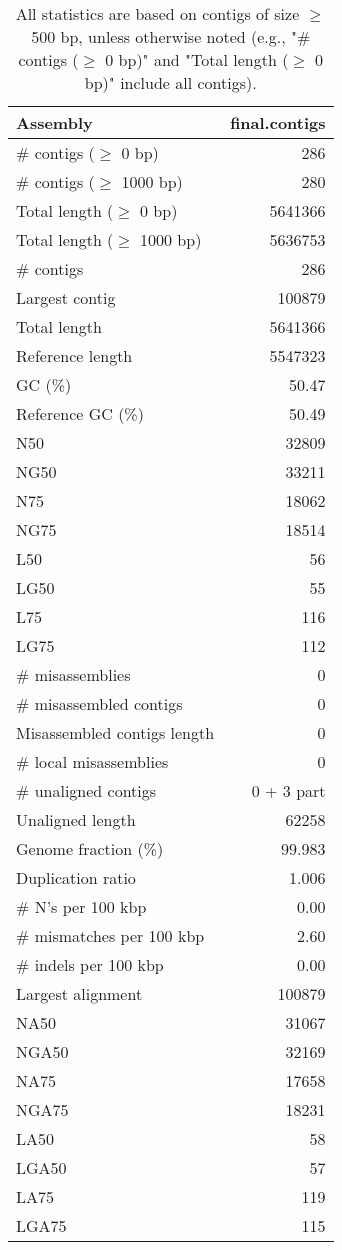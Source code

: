 \documentclass[12pt,a4paper]{article}
\begin{document}
\begin{table}[ht]
\begin{center}
\caption{All statistics are based on contigs of size $\geq$ 500 bp, unless otherwise noted (e.g., "\# contigs ($\geq$ 0 bp)" and "Total length ($\geq$ 0 bp)" include all contigs).}
\begin{tabular}{|l*{1}{|r}|}
\hline
Assembly & final.contigs \\ \hline
\# contigs ($\geq$ 0 bp) & 286 \\ \hline
\# contigs ($\geq$ 1000 bp) & 280 \\ \hline
Total length ($\geq$ 0 bp) & 5641366 \\ \hline
Total length ($\geq$ 1000 bp) & 5636753 \\ \hline
\# contigs & 286 \\ \hline
Largest contig & 100879 \\ \hline
Total length & 5641366 \\ \hline
Reference length & 5547323 \\ \hline
GC (\%) & 50.47 \\ \hline
Reference GC (\%) & 50.49 \\ \hline
N50 & 32809 \\ \hline
NG50 & 33211 \\ \hline
N75 & 18062 \\ \hline
NG75 & 18514 \\ \hline
L50 & 56 \\ \hline
LG50 & 55 \\ \hline
L75 & 116 \\ \hline
LG75 & 112 \\ \hline
\# misassemblies & 0 \\ \hline
\# misassembled contigs & 0 \\ \hline
Misassembled contigs length & 0 \\ \hline
\# local misassemblies & 0 \\ \hline
\# unaligned contigs & 0 + 3 part \\ \hline
Unaligned length & 62258 \\ \hline
Genome fraction (\%) & 99.983 \\ \hline
Duplication ratio & 1.006 \\ \hline
\# N's per 100 kbp & 0.00 \\ \hline
\# mismatches per 100 kbp & 2.60 \\ \hline
\# indels per 100 kbp & 0.00 \\ \hline
Largest alignment & 100879 \\ \hline
NA50 & 31067 \\ \hline
NGA50 & 32169 \\ \hline
NA75 & 17658 \\ \hline
NGA75 & 18231 \\ \hline
LA50 & 58 \\ \hline
LGA50 & 57 \\ \hline
LA75 & 119 \\ \hline
LGA75 & 115 \\ \hline
\end{tabular}
\end{center}
\end{table}
\end{document}
